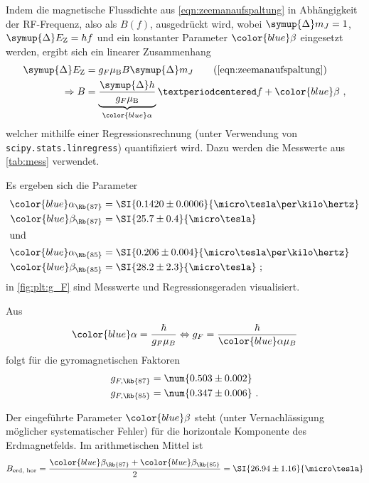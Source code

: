 Indem die magnetische Flussdichte aus \autoref{eqn:zeemanaufspaltung} %
in Abhängigkeit der RF-Frequenz, also als $B(f)$, ausgedrückt wird,
wobei $\symup{\Delta} m_J = 1$, $\symup{\Delta} E_\text{Z} = hf$ und ein konstanter Parameter ${\color{blue} \beta}$ eingesetzt werden,
ergibt sich ein linearer Zusammenhang
\begin{align*}
    \symup{\Delta} E_\text{Z} &= g_F \mu_\text{B} B \symup{\Delta} m_J \tag{\ref{eqn:zeemanaufspaltung}} \\
    \Rightarrow
    B &= \underbrace{\frac{\symup{\Delta} h}{g_F \mu_\text{B}}}_{\color{blue} \alpha} · f
    + {\color{blue} \beta} \ ,
\end{align*}
welcher mithilfe einer Regressionsrechnung
(unter Verwendung von \texttt{scipy.stats.linregress})
quantifiziert wird.
Dazu werden die Messwerte aus \autoref{tab:mess} verwendet.

Es ergeben sich die Parameter
\begin{align*}
    {\color{blue} \alpha_{\Rb{87}}} &= \SI{0.1420 \pm 0.0006}{\micro\tesla\per\kilo\hertz} \\
    {\color{blue} \beta_{\Rb{87}}} &= \SI{25.7 \pm 0.4}{\micro\tesla} \\
    \intertext{und}
    {\color{blue} \alpha_{\Rb{85}}} &= \SI{0.206 \pm 0.004}{\micro\tesla\per\kilo\hertz} \\
    {\color{blue} \beta_{\Rb{85}}} &= \SI{28.2 \pm 2.3}{\micro\tesla} \ ;
\end{align*}
in \autoref{fig:plt:g_F} sind Messwerte und Regressionsgeraden visualisiert.

Aus
\[
    {\color{blue} \alpha} = \frac{\hbar}{g_F \mu_B}
    \Leftrightarrow
    g_F = \frac{\hbar}{{\color{blue} \alpha} \mu_B}
\]
folgt für die gyromagnetischen Faktoren
\begin{align*}
    g_{F, \Rb{87}} &= \num{0.503 \pm 0.002} \\
    g_{F, \Rb{85}} &= \num{0.347 \pm 0.006} \ .
\end{align*}


Der eingeführte Parameter $\color{blue} \beta$ steht
(unter Vernachlässigung möglicher systematischer Fehler)
für die horizontale Komponente des Erdmagnetfelds.
Im arithmetischen Mittel ist
\[
    B_\text{erd, hor}
    = \frac{{\color{blue} \beta_{\Rb{87}}} + \color{blue} \beta_{\Rb{85}}}{2}
    = \SI{26.94 \pm 1.16}{\micro\tesla}
\]

